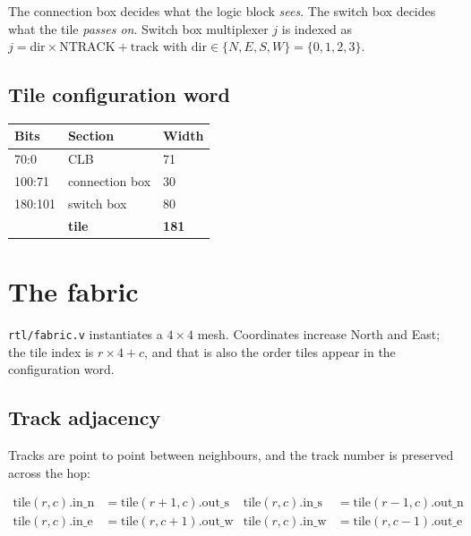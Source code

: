 \documentclass[11pt,a4paper]{article}
\newcommand{\file}[1]{\texttt{#1}}
\begin{document}
The connection box decides what the logic block \emph{sees}. The switch box
decides what the tile \emph{passes on}. Switch box multiplexer $j$ is indexed as
$j = \text{dir} \times \text{NTRACK} + \text{track}$ with
$\text{dir} \in \{N, E, S, W\} = \{0,1,2,3\}$.

\subsection{Tile configuration word}

\begin{center}
\begin{tabular}{lll}
\toprule
\textbf{Bits} & \textbf{Section} & \textbf{Width} \\
\midrule
70:0    & CLB            & 71 \\
100:71  & connection box & 30 \\
180:101 & switch box     & 80 \\
\midrule
        & \textbf{tile}  & \textbf{181} \\
\bottomrule
\end{tabular}
\end{center}

\section{The fabric}

\file{rtl/fabric.v} instantiates a $4 \times 4$ mesh. Coordinates increase North
and East; the tile index is $r \times 4 + c$, and that is also the order tiles
appear in the configuration word.

\subsection{Track adjacency}

Tracks are point to point between neighbours, and the track number is preserved
across the hop:

\begin{align*}
\text{tile}(r,c).\text{in\_n} &= \text{tile}(r{+}1,c).\text{out\_s} &
\text{tile}(r,c).\text{in\_s} &= \text{tile}(r{-}1,c).\text{out\_n} \\
\text{tile}(r,c).\text{in\_e} &= \text{tile}(r,c{+}1).\text{out\_w} &
\text{tile}(r,c).\text{in\_w} &= \text{tile}(r,c{-}1).\text{out\_e}
\end{align*}
\end{document}
